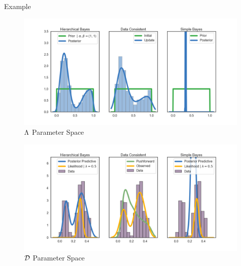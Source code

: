 \begin{block}{Example}
\begin{figure}
        \includegraphics[width=30cm]{figures/distr_EX_lambda_space.png}
        \vspace{-1.5cm}
        \centering
        \caption{ $\Lambda$ Parameter Space }
\end{figure}
\begin{figure}
        \includegraphics[width=30cm]{figures/distr_EX_data_space.png}
        \vspace{-1.5cm}
        \centering
        \caption{$\mathcal{D}$ Parameter Space  }
\end{figure}


\end{block}





